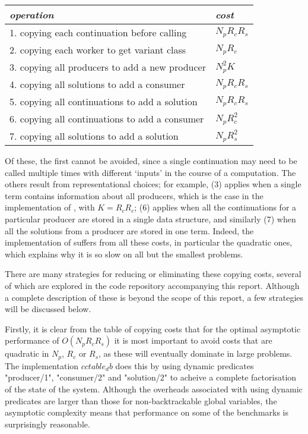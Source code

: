 \begin{center}
\begin{tabular}{ll}
  \emph{operation} & \emph{cost} \\
  \hline
  1. copying each continuation before calling    & $N_p R_c R_s$ \\
  2. copying each worker to get variant class    & $N_p R_c$ \\
  3. copying all producers to add a new producer & $N_p^2 K $ \\
  4. copying all solutions to add a consumer     & $N_p R_c R_s$ \\
  5. copying all continuations to add a solution & $N_p R_c R_s$ \\
  6. copying all continuations to add a consumer & $N_p R_c^2$ \\
  7. copying all solutions to add a solution     & $N_p R_s^2$ \\
\end{tabular}
\end{center}
%
Of these, the first cannot be avoided, since a single continuation may need to
be called multiple times with different `inputs' in the course of a computation.
The others result from representational choices; for example, (3) applies when
a single term contains information about all producers, which is the case
in the implementation of , with $K = R_c R_c$; (6) applies
when all the continuations for a particular producer are stored in a single
data structure, and similarly (7) when all the solutions from a producer are
stored in one term. Indeed, the implementation of  suffers from
all these costs, in particular the quadratic ones, which explains why it is so slow
on all but the smallest problems.

There are many strategies for reducing or eliminating these copying costs,
several of which are explored in the code repository accompanying this report.
Although a complete description of these is beyond the scope of this report, a few
strategies will be discussed below.

Firstly, it is clear from the table of copying costs that for the optimal asymptotic 
performance of $O(N_p R_c R_s)$ it is most important to avoid costs that are quadratic 
in $N_p$, $R_c$ or $R_s$, as these will eventually dominate in large problems.
The implementation $cctable_db$ does this by using dynamic predicates "producer/1",
"consumer/2" and "solution/2" to acheive a complete factorisation of the state of
the system. Although the overheads associated with using dynamic predicates are larger
than those for non-backtrackable global variables, the asymptotic complexity means
that performance on some of the benchmarks is surprisingly reasonable.

